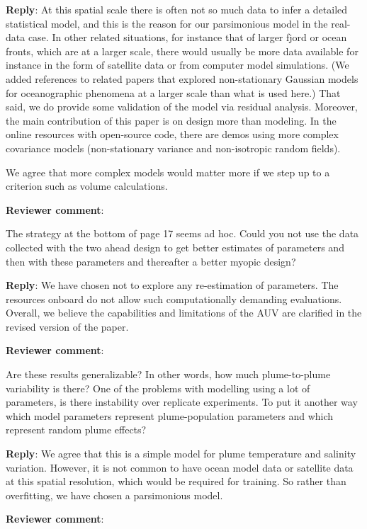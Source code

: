 \documentclass[a4paper]{article}
\def\revcom{\textbf{Reviewer comment}}
\def\reply{\textbf{Reply}}
\begin{document}
\begin{answers}
\reply: At this spatial scale there is often not so much data to infer a detailed statistical model, and this is the reason for our parsimonious model in the real-data case. In other related situations, for instance that of larger fjord or ocean fronts, which are at a larger scale, there would usually be more data available for instance in the form of satellite data or from computer model simulations. (We added references to related papers that explored non-stationary Gaussian models for oceanographic phenomena at a larger scale than what is used here.) That said, we do provide some validation of the model via residual analysis. Moreover, the main contribution of this paper is on design more than modeling. In the online resources with open-source code, there are demos using more complex covariance models (non-stationary variance and non-isotropic random fields). 

We agree that more complex models would matter more if we step up to a criterion such as volume calculations.   

\item{\revcom  :}\label{r1c10}

The strategy at the bottom of page 17 seems ad hoc. Could you not use the data collected with the two ahead design to get better estimates of parameters and then with these parameters and thereafter a better myopic design?

\reply: We have chosen not to explore any re-estimation of parameters. The resources onboard do not allow such computationally demanding evaluations. Overall, we believe the capabilities and limitations of the AUV are clarified in the revised version of the paper.

\item{\revcom :}\label{r1c11}

Are these results generalizable? In other words, how much plume-to-plume variability is there? One of the problems with modelling using a lot of parameters, is there instability over replicate experiments. To put it another way which model parameters represent plume-population parameters and which represent random plume effects?

\reply: We agree that this is a simple model for plume temperature and salinity variation. However, it is not common to have ocean model data or satellite data at this spatial resolution, which would be required for training. So rather than overfitting, we have chosen a parsimonious model.

\item{\revcom :}\label{r1c12}


\end{answers}
\end{document}

